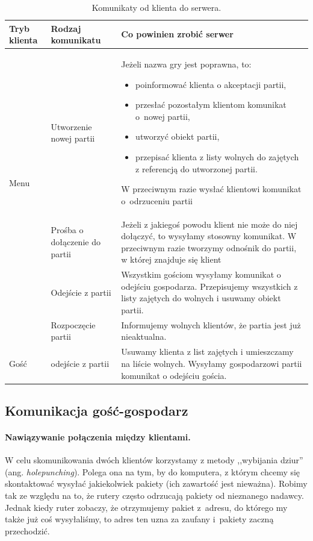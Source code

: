 \documentclass[a4paper, 12pt]{article}
\begin{document}
\begin{table}
\caption{Komunikaty od klienta do serwera.}
\begin{center}
 \begin{tabular}{p{2cm}||p{3.5cm}||p{9cm}}
 \hbox{Tryb} klienta& Rodzaj komunikatu & Co powinien zrobić serwer\\ \hline \hline
\multirow{3}{*}{Menu}
  & Utworzenie nowej partii
  & Jeżeli nazwa gry jest poprawna, to:
      \begin{itemize}
      \item poinformować klienta o akceptacji partii,
      \item przesłać pozostałym klientom komunikat o~nowej partii,
      \item utworzyć obiekt partii,
      \item przepisać klienta z listy wolnych do zajętych z referencją do utworzonej partii.
      \end{itemize}
    W przeciwnym razie wysłać klientowi komunikat o~odrzuceniu partii \\ \cline{2-3}

  & Prośba o dołączenie do partii
  & Jeżeli z jakiegoś powodu klient nie może do niej dołączyć, to wysyłamy stosowny komunikat. W przeciwnym razie tworzymy odnośnik do partii, w której znajduje się klient\\ \hline

\multirow{2}{*}{Gospodarz}
  & Odejście z partii
  & Wszystkim gościom wysyłamy komunikat o odejściu gospodarza. Przepisujemy wszystkich z listy zajętych do wolnych i usuwamy obiekt partii.\\ \cline{2-3}

  & Rozpoczęcie partii
  & Informujemy wolnych klientów, że partia jest już nieaktualna.\\ \hline \hline

Gość & odejście z partii & Usuwamy klienta z list zajętych i umieszczamy na liście wolnych. Wysyłamy gospodarzowi partii komunikat o odejściu gościa.

\end{tabular}
\label{tab:klidoser}
\end{center}
\end{table}


\subsection{Komunikacja gość-gospodarz}

\paragraph{Nawiązywanie połączenia między klientami.} W celu skomunikowania dwóch klientów korzystamy z metody ,,wybijania dziur'' (ang. \textit{holepunching}). Polega ona na tym, by do komputera, z którym chcemy się skontaktować wysyłać jakiekolwiek pakiety (ich zawartość jest nieważna). Robimy tak ze względu na to, że rutery często odrzucają pakiety od nieznanego nadawcy. Jednak kiedy ruter zobaczy, że otrzymujemy pakiet z~adresu, do którego my także już coś wysyłaliśmy, to adres ten uzna za zaufany i~pakiety zaczną przechodzić. 
\end{document}
